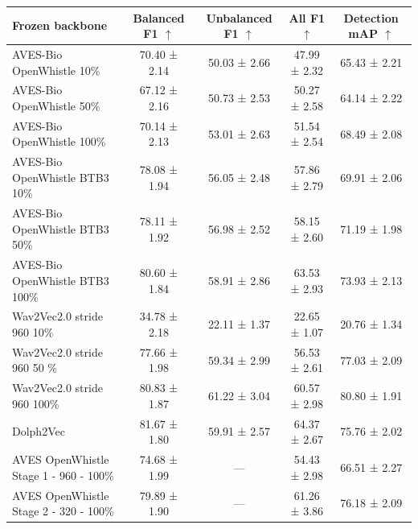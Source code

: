 \begin{tabular}{lcccc}
\toprule
Frozen backbone & Balanced F1 $\uparrow$ & Unbalanced F1 $\uparrow$ & All F1 $\uparrow$ & Detection mAP $\uparrow$ \\
\midrule
AVES-Bio OpenWhistle 10\% & 70.40 ± 2.14 & 50.03 ± 2.66 & 47.99 ± 2.32 & 65.43 ± 2.21 \\
AVES-Bio OpenWhistle 50\% & 67.12 ± 2.16 & 50.73 ± 2.53 & 50.27 ± 2.58 & 64.14 ± 2.22 \\
AVES-Bio OpenWhistle 100\% & 70.14 ± 2.13 & 53.01 ± 2.63 & 51.54 ± 2.54 & 68.49 ± 2.08 \\
AVES-Bio OpenWhistle BTB3 10\% & 78.08 ± 1.94 & 56.05 ± 2.48 & 57.86 ± 2.79 & 69.91 ± 2.06 \\
AVES-Bio OpenWhistle BTB3 50\% & 78.11 ± 1.92 & 56.98 ± 2.52 & 58.15 ± 2.60 & 71.19 ± 1.98 \\
AVES-Bio OpenWhistle BTB3 100\% & 80.60 ± 1.84 & 58.91 ± 2.86 & 63.53 ± 2.93 & 73.93 ± 2.13 \\
Wav2Vec2.0 stride 960 10\% & 34.78 ± 2.18 & 22.11 ± 1.37 & 22.65 ± 1.07 & 20.76 ± 1.34 \\
Wav2Vec2.0 stride 960 50 \% & 77.66 ± 1.98 & 59.34 ± 2.99 & 56.53 ± 2.61 & 77.03 ± 2.09 \\
Wav2Vec2.0 stride 960 100\% & 80.83 ± 1.87 & 61.22 ± 3.04 & 60.57 ± 2.98 & 80.80 ± 1.91 \\
Dolph2Vec & 81.67 ± 1.80 & 59.91 ± 2.57 & 64.37 ± 2.67 & 75.76 ± 2.02 \\
AVES OpenWhistle Stage 1 - 960 - 100\% & 74.68 ± 1.99 & — & 54.43 ± 2.98 & 66.51 ± 2.27 \\
AVES OpenWhistle Stage 2 - 320 - 100\% & 79.89 ± 1.90 & — & 61.26 ± 3.86 & 76.18 ± 2.09 \\
\bottomrule
\end{tabular}
